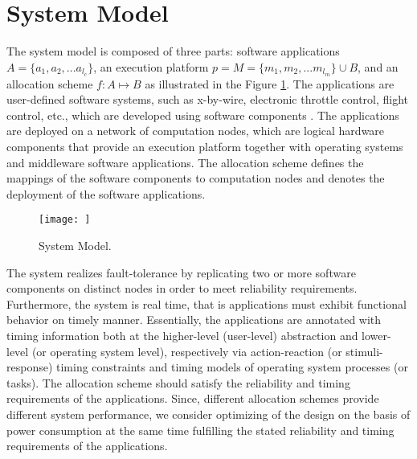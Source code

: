 \section{System Model}\label{sec_system}
The system model is composed of three parts: software applications $A=\{a_1, a_2,...a_{l_c}\}$, an execution platform $p=M=\{m_1, m_2,...m_{l_m}\}\cup B$, and an allocation scheme $f:A\mapsto B$ as illustrated in the Figure \ref{fig_softwareallocation}. The applications are user-defined software systems, such as x-by-wire, electronic throttle control, flight control, etc., which are developed using software components \cite{softwarecomponents}\cite{Crnkovic2002BuildingSystems}. The applications are deployed on a network of computation nodes, which are logical hardware components that provide an execution platform together with operating systems and middleware software applications. The allocation scheme defines the mappings of the software components to computation nodes and  denotes the deployment of the software applications.

\begin{figure}[!h]
\centering
\texttt{[image: ]}
\caption{System Model.}
\label{fig_softwareallocation}
\end{figure}

The system realizes fault-tolerance by replicating two or more software components on distinct nodes in order to meet reliability requirements. Furthermore, the system is real time, that is applications must exhibit functional behavior on timely manner. Essentially, the applications are annotated with timing information both at the higher-level (user-level) abstraction and lower-level (or operating system level), respectively via action-reaction (or stimuli-response) timing constraints and timing models of operating system processes (or tasks). The allocation scheme should satisfy the reliability and timing requirements of the applications. Since, different allocation schemes provide different system performance, we consider optimizing of the design on the basis of power consumption at the same time fulfilling the stated reliability and timing requirements of the applications.


